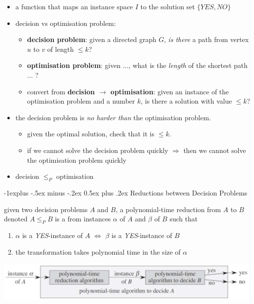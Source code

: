 \documentclass[10pt, landscape]{article}
\makeatletter
\renewcommand{\subsection}{\@startsection{subsection}{2}{0mm}%
  {-1explus -.5ex minus -.2ex}%
  {0.5ex plus .2ex}%
{\normalfont\normalsize\bfseries}}
\makeatother
\begin{document}
\begin{multicols*}{4}
  \begin{itemize}
    \item {} a function that maps an instance space $I$ to the solution set $\{YES, NO\}$
    \item decision vs optimisation problem:
      \begin{itemize}
        \item \textbf{decision problem}: given a directed graph $G$, \textit{is there} a path from vertex $u$ to $v$ of length $\leq k$?
        \item \textbf{optimisation problem}: given ..., what is the \textit{length} of the shortest path ... ?
        \item convert from \textbf{decision $\rightarrow$ optimisation}: given an instance of the optimisation problem and a number $k$, is there a solution with value $\leq k$?
      \end{itemize}
    \item the decision problem is \textit{no harder than} the optimisation problem.
      \begin{itemize}
        \item given the optimal solution, check that it is $\leq k$.
        \item if we cannot solve the decision problem quickly $\Rightarrow$ then we cannot solve the optimisation problem quickly
      \end{itemize}
    \item decision $\leq_P$ optimisation
  \end{itemize}

  \subsection{Reductions between Decision Problems}

  given two decision problems $A$ and $B$, a polynomial-time reduction from $A$ to $B$ denoted $A \leq_P B$ is a  from instances $\alpha$ of $A$ and $\beta$ of $B$ such that
  \begin{enumerate}
    \item $\alpha$ is a \textit{YES}-instance of $A$ $\iff$ $\beta$ is a \textit{YES}-instance of $B$
    \item the transformation takes polynomial time in the size of $\alpha$
  \end{enumerate}

  \begin{tightcenter}
    \includegraphics[width=0.95\linewidth]{cs3230-reductions-decision-problems.png} 
  \end{tightcenter}


\end{multicols*}
\end{document}
